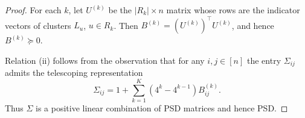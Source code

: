 \documentclass[10pt,a4paper]{amsart}
\begin{document}
\begin{proof}
    
For each $k$, let $U^{(k)}$ be the $|R_k|\times n$ matrix whose
rows are the indicator vectors of clusters $L_u$, $u\in R_k$.
Then $B^{(k)}=(U^{(k)})^{\top}U^{(k)}$, and hence $B^{(k)}\succeq0$.
    
 Relation (ii) follows from the observation that for any
$i,j\in[n]$ the entry $\Sigma_{ij}$ admits the telescoping
representation
\begin{equation}\label{eq:PSDU}
\Sigma_{ij}=1+\sum_{k=1}^{K}(4^k-4^{k-1})B_{ij}^{(k)}.
\end{equation}
Thus $\Sigma$ is a positive linear combination of PSD
matrices and hence PSD.
\end{proof}
\end{document}
